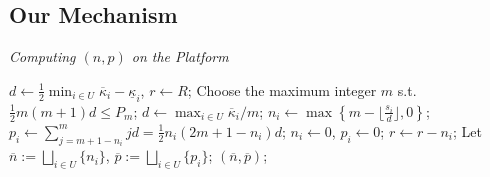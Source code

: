 \documentclass[conference]{IEEEtran}
\theoremstyle{definition}
\begin{document}
\subsection{Our Mechanism}
\begin{algorithm}[!t]
\begin{small}
\caption{\emph{Computing $(n, p)$ on the Platform}}
\label{alg:np}
\renewcommand{\algorithmicrequire}{\textbf{Input:}}
\renewcommand{\algorithmicensure}{\textbf{Output:}}
\begin{algorithmic}[1]
\State $d \gets \frac{1}{2}\min_{i\in U} \overline{\kappa}_i - \underline{\kappa}_i$, $r\gets R$;
\State Choose the maximum integer $m$ s.t. $\frac{1}{2}m(m+1)d \leq P_m$;
	\State $d \gets \max_{i\in U} \overline{\kappa}_i/m$;
\EndIf
{}
	\State $n_i \gets \max \left\{ m-\lfloor \frac{s_i}{d}\rfloor, 0 \right\}$;
		\State $p_i \gets \sum_{j=m+1-n_i}^m jd = \frac{1}{2}n_i(2m+1-n_i)d$;
	\Else
		\State $n_i \gets 0$, $p_i\gets 0$;
	\EndIf
	\State $r \gets r-n_i$;
\EndFor
\State Let $\overline{n} := \bigsqcup_{i\in U} \{n_i\}$, $\overline{p} := \bigsqcup_{i\in U} \{p_i\}$;
 $(\overline{n}, \overline{p})$;
\end{algorithmic}
\end{small}
\end{algorithm}
\addtocounter{footnote}{1}

\newcommand{\putRect}[4]{
\multiput (#1, #2)(0, -#4){2}{\line(1,0){#3}}
\multiput (#1, #2)(#3, 0){2}{\line(0,-1){#4}}
}
\end{document}
